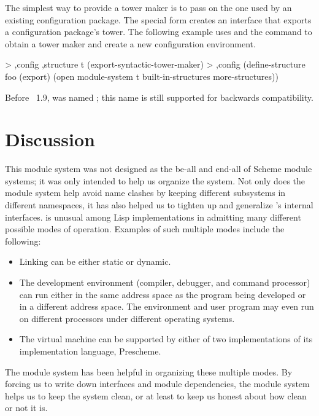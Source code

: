 The simplest way to provide a tower maker is to pass on the one used by
 an existing configuration package.
The special form  creates an interface
 that exports a configuration package's tower.
The following example uses  and
 the  command to obtain a tower maker and create a new
 configuration environment.

\begin{example}
> ,config ,structure t (export-syntactic-tower-maker)
> ,config (define-structure foo (export)
            (open module-system
                  t
                  built-in-structures
                  more-structures))
\end{example}

Before \hack{}~1.9,  was named
 ; this name is still supported for
 backwards compatibility.


\section{Discussion}

This module system was not designed as the be-all and end-all of
Scheme module systems; it was only intended to help us
organize the \hack{} system.  Not only does the module system
help avoid name clashes by keeping different subsystems in different
namespaces, it has also helped us to tighten up and generalize
\hack{}'s internal interfaces.  \hack{} is unusual among Lisp
implementations in admitting many different possible modes of
operation.  Examples of such multiple modes include the following:
\begin{itemize}
    \item Linking can be either static or dynamic.

    \item The development environment (compiler, debugger, and command
    processor) can run either in the same address space as the program
    being developed or in a different address space.  The environment and
    user program may even run on different processors under different
    operating systems\cite{Rees-Donald:Program}.

    \item The virtual machine can be supported by either
    of two implementations of its implementation language, Prescheme.
\end{itemize}
The module system has been helpful in organizing these multiple modes.
By forcing us to write down interfaces and module dependencies, the
module system helps us to keep the system clean, or at least to keep
us honest about how clean or not it is.

